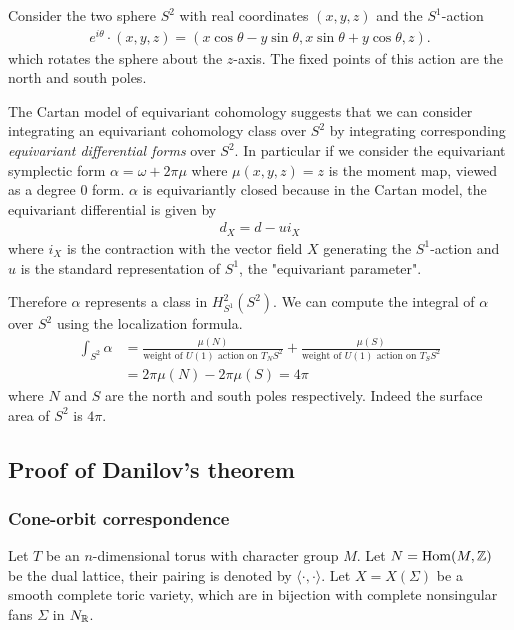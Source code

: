 \begin{example}
    Consider the two sphere $S^2$ with real coordinates $(x,y,z)$ and the $S^1$-action \begin{align*}
        e^{i\theta}\cdot(x,y,z) = (x\cos\theta - y\sin\theta, x\sin\theta + y\cos\theta, z).
    \end{align*}
    which rotates the sphere about the $z$-axis. The fixed points of this action are the north and south poles.

    \hfill 

    The Cartan model of equivariant cohomology suggests that we can consider integrating an equivariant cohomology
    class over $S^2$ by integrating corresponding \emph{equivariant differential forms} over $S^2$. In particular
    if we consider the equivariant symplectic form $\alpha = \omega + 2\pi\mu$ where $\mu(x,y,z) = z$
    is the moment map, viewed as a degree $0$ form. $\alpha$ is equivariantly closed because
    in the Cartan model, the equivariant differential is given by \begin{align*}
        d_X = d - ui_X
    \end{align*} where $i_X$ is the contraction with the vector field $X$ generating the $S^1$-action
    and $u$ is the standard representation of $S^1$, the "equivariant parameter". 

    Therefore $\alpha$ represents a class in $H^2_{S^1}(S^2)$. We can compute the integral of $\alpha$ over $S^2$ 
    using the localization formula. \begin{align*}
        \int_{S^2} \alpha &= \frac{\mu(N)}{\text{weight of $U(1)$ action on $T_N S^2$}} 
        + \frac{\mu(S)}{\text{weight of $U(1)$ action on $T_S S^2$}} \\
        &= 2\pi\mu(N) - 2\pi\mu(S) = 4\pi
    \end{align*} where $N$ and $S$ are the north and south poles respectively. Indeed
    the surface area of $S^2$ is $4\pi$.
\end{example}

\subsection{Proof of Danilov's theorem}
\subsubsection{Cone-orbit correspondence}
Let $T$ be an $n$-dimensional torus with character group $M$. Let $N = \operatorname{Hom}(M,\mathbb{Z})$ be the
dual lattice, their pairing is denoted by $\langle \cdot,\cdot\rangle$. Let $X = X(\Sigma)$ be a smooth
complete toric variety, which are in bijection with complete nonsingular fans $\Sigma$ in $N_{\mathbb{R}}$.

